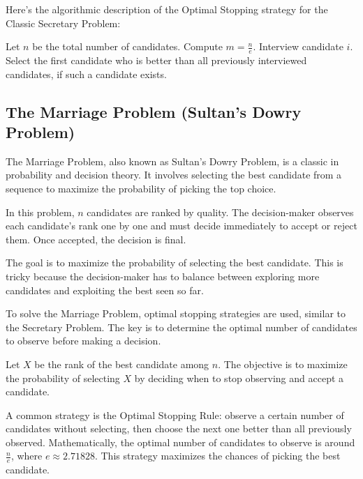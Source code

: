 \documentclass[12pt]{book} %
\begin{document}
Here's the algorithmic description of the Optimal Stopping strategy for the Classic Secretary Problem:
\FloatBarrier
\begin{algorithm}
\caption{Optimal Stopping Algorithm for Classic Secretary Problem}
\begin{algorithmic}[1]
\State Let \(n\) be the total number of candidates.
\State Compute \(m = \frac{n}{e}\).
    \State Interview candidate \(i\).
\EndFor
\State Select the first candidate who is better than all previously interviewed candidates, if such a candidate exists.
\end{algorithmic}
\end{algorithm}

\subsection{The Marriage Problem (Sultan's Dowry Problem)}

The Marriage Problem, also known as Sultan's Dowry Problem, is a classic in probability and decision theory. It involves selecting the best candidate from a sequence to maximize the probability of picking the top choice.

In this problem, \(n\) candidates are ranked by quality. The decision-maker observes each candidate's rank one by one and must decide immediately to accept or reject them. Once accepted, the decision is final.

The goal is to maximize the probability of selecting the best candidate. This is tricky because the decision-maker has to balance between exploring more candidates and exploiting the best seen so far.

To solve the Marriage Problem, optimal stopping strategies are used, similar to the Secretary Problem. The key is to determine the optimal number of candidates to observe before making a decision.

Let \(X\) be the rank of the best candidate among \(n\). The objective is to maximize the probability of selecting \(X\) by deciding when to stop observing and accept a candidate.

A common strategy is the Optimal Stopping Rule: observe a certain number of candidates without selecting, then choose the next one better than all previously observed. Mathematically, the optimal number of candidates to observe is around \(\frac{n}{e}\), where \(e \approx 2.71828\). This strategy maximizes the chances of picking the best candidate.
\end{document}
